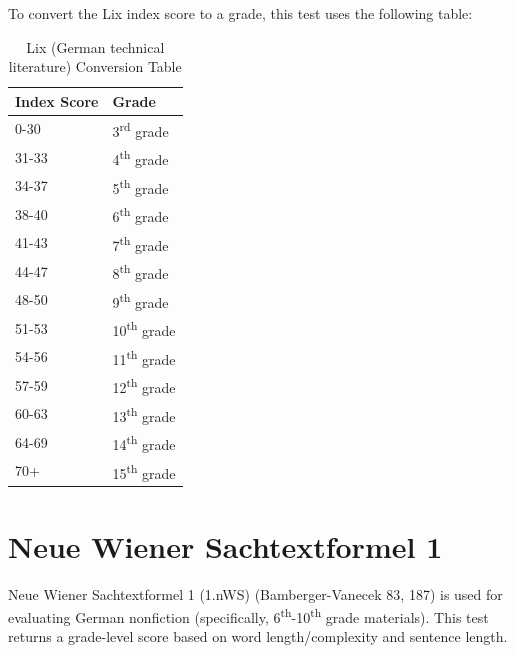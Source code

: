 \documentclass[
]{book}
\theoremstyle{definition}
\theoremstyle{definition}
\theoremstyle{definition}
\theoremstyle{definition}
\theoremstyle{remark}
\begin{document}
\begin{minipage}{\textwidth}

To convert the Lix index score to a grade, this test uses the following table:

\begin{table}

\caption{\label{tab:unnamed-chunk-45}Lix (German technical literature) Conversion Table}
\centering
\begin{tabular}[t]{ll}
\toprule
Index Score & Grade\\
\midrule
0-30 & 3\textsuperscript{rd} grade\\
31-33 & 4\textsuperscript{th} grade\\
34-37 & 5\textsuperscript{th} grade\\
38-40 & 6\textsuperscript{th} grade\\
41-43 & 7\textsuperscript{th} grade\\
44-47 & 8\textsuperscript{th} grade\\
48-50 & 9\textsuperscript{th} grade\\
51-53 & 10\textsuperscript{th} grade\\
54-56 & 11\textsuperscript{th} grade\\
57-59 & 12\textsuperscript{th} grade\\
60-63 & 13\textsuperscript{th} grade\\
64-69 & 14\textsuperscript{th} grade\\
70+ & 15\textsuperscript{th} grade\\
\bottomrule
\end{tabular}
\end{table}

\end{minipage}

\newpage

\hypertarget{neue-wiener-sachtextformel1}{%
\section{\texorpdfstring{Neue Wiener Sachtextformel 1}{Neue Wiener Sachtextformel 1}}\label{neue-wiener-sachtextformel1}}

Neue Wiener Sachtextformel 1 (1.nWS) (Bamberger-Vanecek 83, 187) is used for evaluating German nonfiction (specifically, 6\textsuperscript{th}-10\textsuperscript{th} grade materials). This test returns a grade-level score based on word length/complexity and sentence length.
\end{document}
